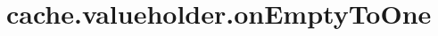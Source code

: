 \section{cache.valueholder.onEmptyToOne}
\label{configuration:CacheValueholderOnEmptyToOne}
\AvailableInJavaAndCsharp{\TODO}